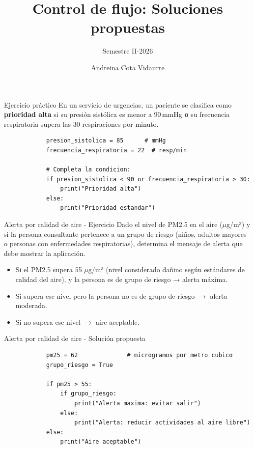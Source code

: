 \documentclass{beamer}
\title{Control de flujo: Soluciones propuestas} %
\subtitle{Semestre II-2026} %
\author{Andreina Cota Vidaurre}
\begin{document}
  \shorthandoff{-}
  \frame[c]{\maketitle}


    \begin{frame}[fragile,t]{Ejercicio práctico}
        En un servicio de urgencias, un paciente se clasifica como
        \textbf{prioridad alta} si su presión sistólica es menor a
        90\,mmHg \textbf{o} su frecuencia respiratoria supera las
        30 respiraciones por minuto.
        \begin{verbatim}
            presion_sistolica = 85      # mmHg
            frecuencia_respiratoria = 22  # resp/min
            
            # Completa la condicion:
            if presion_sistolica < 90 or frecuencia_respiratoria > 30:
                print("Prioridad alta")
            else:
                print("Prioridad estandar")
        \end{verbatim}
    \end{frame}

    \begin{frame}{Alerta por calidad de aire - Ejercicio}
        Dado el nivel de PM2.5 en el aire ($\mu$g/m³) y si la persona consultante pertenece 
        a un grupo de riesgo (niños, adultos mayores o personas con enfermedades respiratorias), 
        determina el mensaje de alerta que debe mostrar la aplicación.

        \begin{itemize}
            \item Si el PM2.5 supera 55 $\mu$g/m³ (nivel considerado dañino según estándares de 
            calidad del aire), y la persona es de grupo de riesgo → alerta máxima.
            \item Si supera ese nivel pero la persona no es de grupo de riesgo $\rightarrow$ alerta moderada.
            \item Si no supera ese nivel $\rightarrow$ aire aceptable.
        \end{itemize}
    \end{frame}

    \begin{frame}[fragile,t]{Alerta por calidad de aire - Solución propuesta}
        \begin{verbatim}
            pm25 = 62              # microgramos por metro cubico
            grupo_riesgo = True

            if pm25 > 55:
                if grupo_riesgo:
                    print("Alerta maxima: evitar salir")
                else:
                    print("Alerta: reducir actividades al aire libre")
            else:
                print("Aire aceptable")
        \end{verbatim}
    \end{frame}
\end{document}
